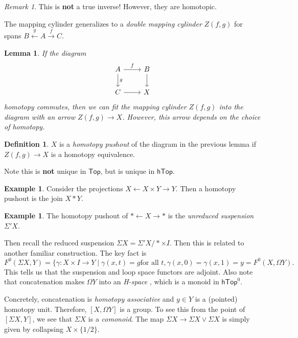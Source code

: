 \documentclass[leqno, openany]{memoir}
\newtheorem{lem}[thm]{Lemma}
\theoremstyle{definition}
\newtheorem{defn}[thm]{Definition}
\newtheorem{exm}[thm]{Example}
\theoremstyle{remark}
\newtheorem{rmk}[thm]{Remark}
\theoremstyle{plain}
\theoremstyle{definition}
\theoremstyle{remark}
\newcommand{\ms}[1]{\mathsf{#1}}
\begin{document}
\begin{rmk}
    This is \textbf{not} a true inverse! However, they are homotopic.
\end{rmk}

The mapping cylinder generalizes to a \textit{double mapping cylinder} $Z(f,g)$ for spans $B \xleftarrow{g} A \xrightarrow{f} C$. 

\begin{lem}
    If the diagram
    \begin{equation}
    \begin{tikzcd}
        A \arrow{r}{f} \arrow{d}{g} & B \arrow{d} \\
        C \arrow{r} & X
    \end{tikzcd}
    \end{equation}
    homotopy commutes, then we can fit the mapping cylinder $Z(f,g)$ into the diagram with an arrow $Z(f,g) \to X$. However, this arrow depends on the choice of homotopy.
\end{lem}

\begin{defn}
    $X$ is a \textit{homotopy pushout}  of the diagram in the previous lemma if $Z(f,g) \to X$ is a homotopy equivalence.
\end{defn}

Note this is \textbf{not} unique in $\ms{Top}$, but is unique in $\ms{hTop}$.

\begin{exm}
    Consider the projections $X \gets X \times Y \to Y$. Then a homotopy pushout is the join $X * Y$.
\end{exm}

\begin{exm}
    The homotopy pushout of $* \gets X \to *$ is the \textit{unreduced suspension} $\Sigma' X$. 
\end{exm}

Then recall the reduced suspension $\Sigma X = \Sigma' X / * \times I$. Then this is related to another familiar construction. The key fact is
\[ F^0(\Sigma X, Y) = \{ \gamma: X \times I \to Y \mid \gamma(x,t) = g \text{for all $t$}, \gamma(x,0) = \gamma(x,1) = y = F^0(X, \Omega Y). \]
This tells us that the suspension and loop space functors are adjoint.
Also note that concatenation makes $\Omega Y$ into an \textit{H-space} , which is a monoid in $\ms{hTop}^0$. 

Concretely, concatenation is \textit{homotopy associative} and $y \in Y$ is a (pointed) homotopy unit. Therefore, $[X, \Omega Y]$ is a group. To see this from the point of $[\Sigma X, Y]$, we see that $\Sigma X$ is a \textit{comonoid}. The map $\Sigma X \to \Sigma X \vee \Sigma X$ is simply given by collapsing $X \times \{ 1/2 \}$.  
\end{document}
